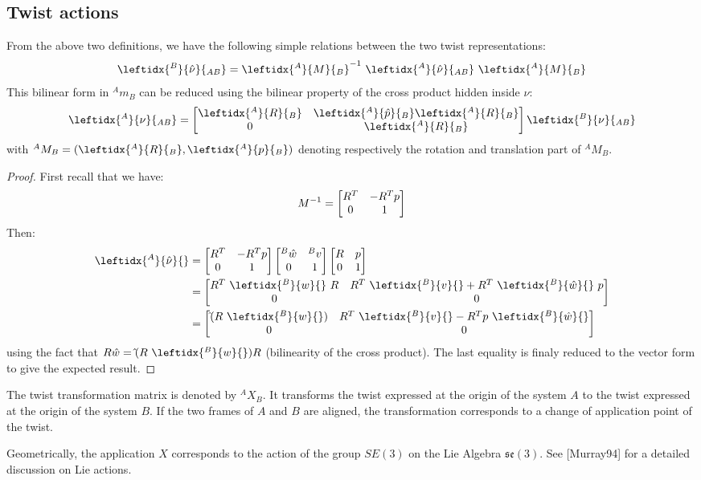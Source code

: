 \documentclass{book}
\begin{document}
\subsection{Twist actions}

From the above two definitions, we have the following simple relations between the two twist representations:
$$ \leftidx{^B}{\hat \nu}{_{AB}} = 
\leftidx{^A}{M}{_{B}}^{-1} \ 
\leftidx{^A}{\hat \nu}{_{AB}} \ 
\leftidx{^A}{M}{_{B}}
$$
This bilinear form in $^Am_B$ can be reduced using the bilinear property of the cross product hidden inside $\nu$:
$$ \leftidx{^A}{\nu}{_{AB}} = \BIN \leftidx{^A}{R}{_B} & \leftidx{^A}{\hat p}{_B} \leftidx{^A}{R}{_B} \\ 0 & \leftidx{^A}{R}{_B} \BOUT  \leftidx{^B}{\nu}{_{AB}}$$
with $^AM_B = ( \leftidx{^A}{R}{_B},  \leftidx{^A}{p}{_B} )$ denoting respectively the rotation and translation part of $^AM_B$.

{\footnotesize
\begin{proof}
First recall that we have:
$$M^{-1} = \begin{bmatrix} R^T & -R^T p \\ 0 & 1 \end{bmatrix}$$
Then:
\begin{align} \leftidx{^A}{\hat \nu}{} &= \BIN R^T & -R^T p \\ 0 & 1 \BOUT 
\BIN ^B\hat w & ^Bv \\ 0 & 1 \BOUT
\BIN R & p \\ 0 & 1 \BOUT 
\\
&=
\BIN R^T \  \leftidx{^B}{w}{}\ R & R^T \ \leftidx{^B}{v}{} + R^T \  \leftidx{^B}{\hat w}{}\  p \\ 0 & 0 \BOUT 
\\
&=
\BIN \hat{} (R\ \leftidx{^B}{w}{})  & R^T \ \leftidx{^B}{v}{} -   R^T p \  \leftidx{^B}{\hat w}{} \\ 0 & 0 \BOUT 
\end{align}
using the fact that $R \hat{w} = \hat{} (R\ \leftidx{^B}{w}{}) R$ (bilinearity of the cross product). The last equality is finaly reduced to the vector form to give the expected result. 
\end{proof}
}

The twist transformation matrix is denoted by $^AX_B$. It transforms the twist expressed at the origin of the system $A$ to the twist expressed at the origin of the system $B$. If the two frames of $A$ and $B$ are aligned, the transformation corresponds to a change of application point of the twist. 

Geometrically, the application $X$ corresponds to the action of the group $SE(3)$ on the Lie Algebra $\mathfrak{se}(3)$. See [Murray94] for a detailed discussion on Lie actions.
\end{document}
